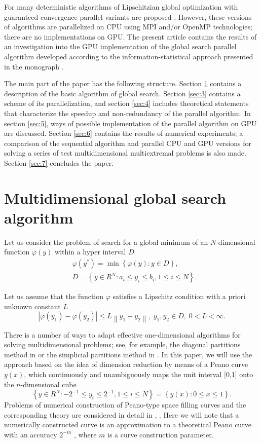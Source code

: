 \documentclass[smallcondensed]{svjour3}     %
\begin{document}
For many deterministic algorithms of Lipschitzian global optimization with guaranteed convergence parallel variants are proposed \cite{RefGergel2005,RefEvtushenko,RefHe,RefPaulavicius}. However, these versions of algorithms are parallelized on CPU using MPI and/or OpenMP technologies; there are no implementations on GPU. The present article contains the results of an investigation into the GPU implementation of the global search parallel algorithm developed according to the information-statistical approach presented in the monograph \cite{RefStrongin2000}.

The main part of the paper has the following structure. Section \ref{sec:2} contains a description of the basic algorithm of global search. Section \ref{sec:3} contains a scheme of its parallelization, and section \ref{sec:4} includes theoretical statements that characterize the speedup and non-redundancy of the parallel algorithm. In section \ref{sec:5}, ways of possible implementation of the parallel algorithm on GPU are discussed. Section \ref{sec:6} contains the results of numerical experiments; a comparison of the sequential algorithm and parallel CPU and GPU versions for solving a series of test multidimensional multiextremal problems is also made. Section \ref{sec:7} concludes the paper.

\section{Multidimensional global search algorithm} \label{sec:2}

Let us consider the problem of search for a global minimum of an $N$-dimensional function $\varphi(y)$ within a hyper interval $D$
\begin{eqnarray}\label{eq:1}
& \varphi(y^\ast)=\min{\left\{\varphi(y):y\in D\right\}},\\
& D=\left\{y\in R^N: a_i\leq y_i \leq b_i, 1\leq i \leq N\right\}. \nonumber
\end{eqnarray}

Let us assume that the function $\varphi$ satisfies a Lipschitz condition with a priori unknown constant $L$
\[
\left|\varphi(y_1)-\varphi(y_2)\right|\leq L\left\|y_1-y_2\right\|,\; y_1,y_2 \in D,\; 0<L<\infty.
\]

There is a number of ways to adapt effective one-dimensional algorithms for solving multidimensional problems; see, for example, the diagonal partitions method in \cite{RefSergeyev2006} or the simplicial partitions method in \cite{RefZilinskas}. In this paper, we will use the approach based on the idea of dimension reduction by means of a Peano curve $y(x)$, which continuously and unambiguously maps the unit interval [0,1] onto the $n$-dimensional cube
\[
\left\{y\in R^N: -2^{-1}\leq y_i \leq 2^{-1}, 1 \leq i \leq N\right\}=\left\{y(x):0\leq x \leq 1 \right\}.
\]
Problems of numerical construction of Peano-type space filling curves and the corresponding theory are considered in detail in \cite{RefStrongin2000}, \cite{RefSergeyev2013}. Here we will note that a numerically constructed curve is an approximation to a theoretical Peano curve with an accuracy $2^{-m}$ , where $m$ is a curve construction parameter.
\end{document}
